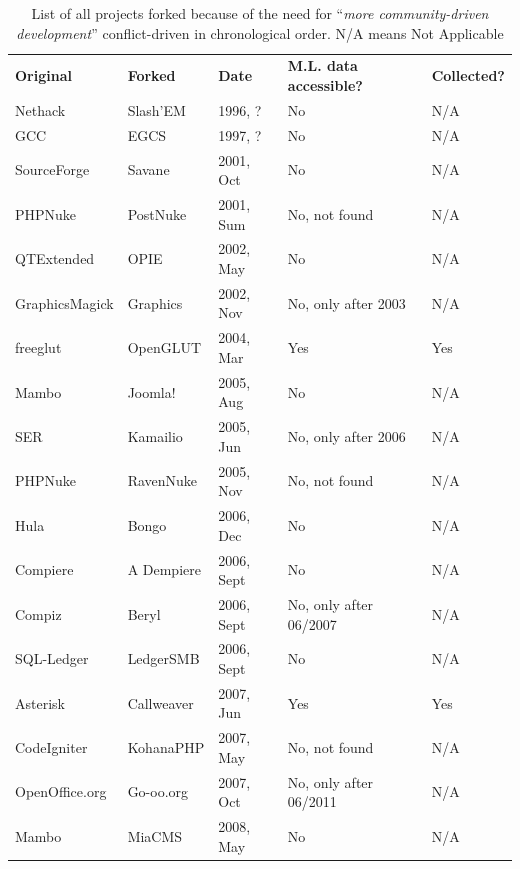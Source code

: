 \documentclass[12pt]{report}
\begin{document}
\begin{appendices}
\pagebreak

\begin{table} [H]
\centering
\caption[List of all projects forked because of the need for ``\textit{more community-driven development}'' conflict-driven]{List of all projects forked because of the need for ``\textit{more community-driven development}'' conflict-driven \cite{Robles} in chronological order. N/A means Not Applicable}
\label{tableProjectsForkedCat2CommunityDriven}
\begin{tabular}{m{} m{} m{} m{} m{}}
\hline\noalign{\smallskip}
\textbf{Original} & \textbf{Forked} & \textbf{Date} & \textbf{M.L. data accessible?} & \textbf{Collected?}\\
\noalign{\smallskip}\hline\noalign{\smallskip}
Nethack & Slash'EM & 1996, ? & No & N/A \\ \hline
GCC & EGCS & 1997, ? & No & N/A \\ \hline
SourceForge & Savane & 2001, Oct & No & N/A \\ \hline
PHPNuke & PostNuke & 2001, Sum & No, not found & N/A \\ \hline
QTExtended & OPIE & 2002, May & No & N/A \\ \hline
GraphicsMagick & Graphics & 2002, Nov  & No, only after 2003 & N/A \\ \hline
freeglut & OpenGLUT & 2004, Mar & Yes & Yes \\ \hline
Mambo & Joomla! & 2005, Aug & No & N/A \\ \hline
SER & Kamailio & 2005, Jun & No, only after 2006 & N/A \\ \hline
PHPNuke & RavenNuke & 2005, Nov & No, not found & N/A \\ \hline
Hula & Bongo & 2006, Dec & No & N/A \\ \hline
Compiere & A Dempiere & 2006, Sept & No & N/A \\ \hline
Compiz & Beryl & 2006, Sept & No, only after 06/2007 & N/A \\ \hline
SQL-Ledger & LedgerSMB & 2006, Sept & No & N/A \\ \hline
Asterisk & Callweaver & 2007, Jun & Yes & Yes \\ \hline
CodeIgniter & KohanaPHP & 2007, May & No, not found & N/A \\ \hline
OpenOffice.org & Go-oo.org & 2007, Oct & No, only after 06/2011 & N/A \\ \hline
Mambo & MiaCMS & 2008, May & No & N/A \\ \hline

\end{tabular}
\end{table}
\end{appendices}
\end{document}
